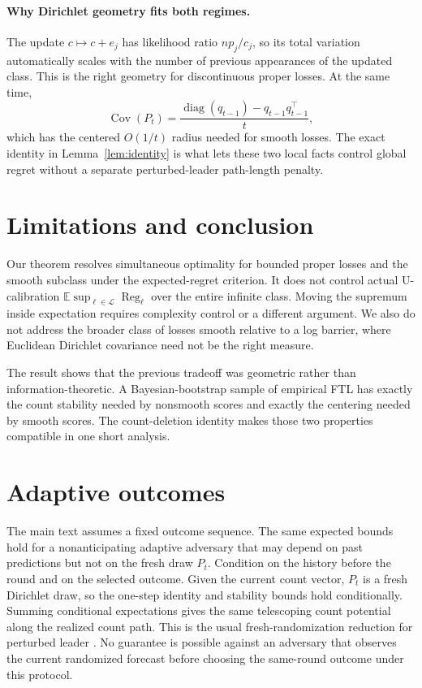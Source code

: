 \documentclass{article}
\theoremstyle{definition}
\theoremstyle{remark}
\newcommand{\E}{\mathbb E}
\newcommand{\Reg}{\operatorname{Reg}}
\begin{document}
\paragraph{Why Dirichlet geometry fits both regimes.}
The update $c\mapsto c+e_j$ has likelihood ratio $np_j/c_j$, so its total variation automatically scales with the number of previous appearances of the updated class.  This is the right geometry for discontinuous proper losses.  At the same time, \[ \operatorname{Cov}(P_t) =\frac{\operatorname{diag}(q_{t-1})-q_{t-1}q_{t-1}^{\top}}{t}, \] which has the centered $O(1/t)$ radius needed for smooth losses.  The exact identity in Lemma~\ref{lem:identity} is what lets these two local facts control global regret without a separate perturbed-leader path-length penalty.

\section{Limitations and conclusion}

Our theorem resolves simultaneous optimality for bounded proper losses and the smooth subclass under the expected-regret criterion.  It does not control actual U-calibration $\E\sup_{\ell\in\mathcal L}\Reg_\ell$ over the entire infinite class.  Moving the supremum inside expectation requires complexity control or a different argument.  We also do not address the broader class of losses smooth relative to a log barrier, where Euclidean Dirichlet covariance need not be the right measure.

The result shows that the previous tradeoff was geometric rather than information-theoretic.  A Bayesian-bootstrap sample of empirical FTL has exactly the count stability needed by nonsmooth scores and exactly the centering needed by smooth scores.  The count-deletion identity makes those two properties compatible in one short analysis.




\appendix

\section{Adaptive outcomes}\label{app:adaptive}

The main text assumes a fixed outcome sequence.  The same expected bounds hold for a nonanticipating adaptive adversary that may depend on past predictions but not on the fresh draw $P_t$.  Condition on the history before the round and on the selected outcome.  Given the current count vector, $P_t$ is a fresh Dirichlet draw, so the one-step identity and stability bounds hold conditionally.  Summing conditional expectations gives the same telescoping count potential along the realized count path.  This is the usual fresh-randomization reduction for perturbed leader \citep{hutter2005adaptive}.  No guarantee is possible against an adversary that observes the current randomized forecast before choosing the same-round outcome under this protocol.
\end{document}
